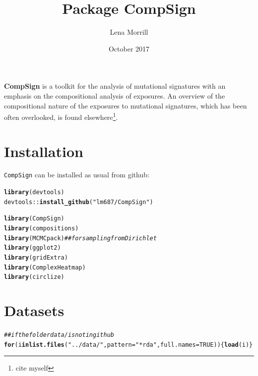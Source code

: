 \documentclass{article}\usepackage[]{graphicx}\usepackage[]{color}
\title{Package \textbf{CompSign}}
\author{Lena Morrill}
\date{October 2017}
\makeatletter
\newcommand{\hlnum}[1]{\textcolor[rgb]{0.686,0.059,0.569}{#1}}%
\newcommand{\hlstr}[1]{\textcolor[rgb]{0.192,0.494,0.8}{#1}}%
\newcommand{\hlcom}[1]{\textcolor[rgb]{0.678,0.584,0.686}{\textit{#1}}}%
\newcommand{\hlopt}[1]{\textcolor[rgb]{0,0,0}{#1}}%
\newcommand{\hlstd}[1]{\textcolor[rgb]{0.345,0.345,0.345}{#1}}%
\newcommand{\hlkwa}[1]{\textcolor[rgb]{0.161,0.373,0.58}{\textbf{#1}}}%
\newcommand{\hlkwc}[1]{\textcolor[rgb]{0.333,0.667,0.333}{#1}}%
\newcommand{\hlkwd}[1]{\textcolor[rgb]{0.737,0.353,0.396}{\textbf{#1}}}%
\newenvironment{kframe}{%
 \def\at@end@of@kframe{}%
 \ifinner\ifhmode%
  \def\at@end@of@kframe{\end{minipage}}%
  \begin{minipage}{\columnwidth}%
 \fi\fi%
 \def\FrameCommand##1{\hskip\@totalleftmargin \hskip-\fboxsep
 \colorbox{shadecolor}{##1}\hskip-\fboxsep
     \hskip-\linewidth \hskip-\@totalleftmargin \hskip\columnwidth}%
 \MakeFramed {\advance\hsize-\width
   \@totalleftmargin\z@ \linewidth\hsize
   \@setminipage}}%
 {\par\unskip\endMakeFramed%
 \at@end@of@kframe}
\newenvironment{knitrout}{}{} %
\makeatother
\begin{document}
\maketitle

\textbf{CompSign} is a toolkit for the analysis of mutational signatures with an emphasis on the compositional analysis of exposures. An overview of the compositional nature of the exposures to mutational signatures, which has been often overlooked, is found elsewhere\footnote{cite myself}.

\tableofcontents





\section{Installation}
\texttt{CompSign} can be installed as usual from github:

\begin{knitrout}
\color{fgcolor}\begin{kframe}
\begin{alltt}
\hlkwd{library}\hlstd{(devtools)}
\hlstd{devtools}\hlopt{::}\hlkwd{install_github}\hlstd{(}\hlstr{"lm687/CompSign"}\hlstd{)}
\end{alltt}
\end{kframe}
\end{knitrout}

\begin{knitrout}
\color{fgcolor}\begin{kframe}
\begin{alltt}
\hlkwd{library}\hlstd{(CompSign)}
\hlkwd{library}\hlstd{(compositions)}
\hlkwd{library}\hlstd{(MCMCpack)}      \hlcom{## for sampling from Dirichlet}
\hlkwd{library}\hlstd{(ggplot2)}
\hlkwd{library}\hlstd{(gridExtra)}
\hlkwd{library}\hlstd{(ComplexHeatmap)}
\hlkwd{library}\hlstd{(circlize)}
\end{alltt}
\end{kframe}
\end{knitrout}

\clearpage
\section{Datasets}
\begin{knitrout}
\color{fgcolor}\begin{kframe}
\begin{alltt}
\hlcom{## if the folder data/ is not in github}
\hlkwa{for}\hlstd{(i} \hlkwa{in} \hlkwd{list.files}\hlstd{(}\hlstr{"../data/"}\hlstd{,} \hlkwc{pattern} \hlstd{=} \hlstr{"*rda"}\hlstd{,} \hlkwc{full.names} \hlstd{=} \hlnum{TRUE}\hlstd{))\{}\hlkwd{load}\hlstd{(i)\}}
\end{alltt}
\end{kframe}
\end{knitrout}
\end{document}
